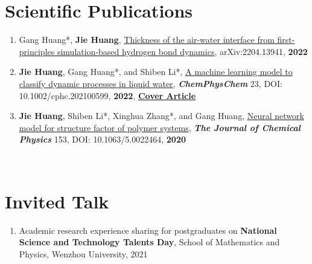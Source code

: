 \documentclass[a4paper,10pt]{article} %
\begin{document}
\section{Scientific Publications}  

\begin{enumerate}
\item Gang Huang*, \textbf{Jie Huang}, \href{https://arxiv.org/abs/2204.13941}{Thickness of the air-water interface from first-principles simulation-based hydrogen bond dynamics},  	arXiv:2204.13941,  \textbf{2022}

\item \textbf{Jie Huang}, Gang Huang*, and Shiben Li*, \href{https://chemistry-europe.onlinelibrary.wiley.com/doi/abs/10.1002/cphc.202100599}{A machine learning model to classify dynamic processes in liquid water},   \textbf{\emph{ChemPhysChem}} 23, DOI: 10.1002/cphc.202100599,  \textbf{2022}, \href{https://cdn.jsdelivr.net/gh/HuangJiaLian/DataBase0@master/uPic/2022_01_05_16_CoverProfile.pdf}{\textbf{Cover Article}}


\item \textbf{Jie Huang}, Shiben Li*, Xinghua Zhang*, and Gang Huang, \href{https://aip.scitation.org/doi/10.1063/5.0022464}{Neural network model for structure factor of polymer systems},  \textbf{\emph{The Journal of Chemical Physics}} 153, DOI: 10.1063/5.0022464, \textbf{2020}
\end{enumerate}
\ 

\section{Invited Talk}  
\begin{enumerate}
	\item Academic research experience sharing for postgraduates on \textbf{National Science and Technology Talents Day}, School of Mathematics and Physics, Wenzhou University, 2021
\end{enumerate}
\
\end{document}

